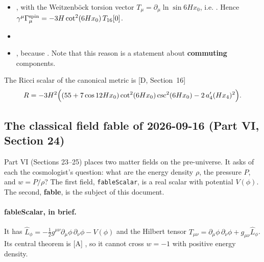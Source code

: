 \begin{itemize}
  \item {},
        with the Weitzenb\"ock torsion vector $T_\mu=\partial_\mu\ln\sin 6Hx_0$, i.e.
        .
        Hence $\gamma^\mu\Gamma^{\rm spin}_\mu=-3H\cot^2(6Hx_0)\,T_{16}[0]$.
  \item {}
  \item {},
        because .
        Note that this reason is a statement about \textbf{commuting} components.
\end{itemize}
The Ricci scalar of the canonical metric is [D, Section~16]
\begin{equation}
  R=-3H^2\Bigl((55+7\cos 12Hx_0)\cot^2(6Hx_0)\csc^2(6Hx_0)-2\,a_4'(Hx_4)^2\Bigr).
\end{equation}

\subsection{The classical field fable of 2026-09-16 (Part VI, Section 24)}
\label{fnd:fable}\label{sec:2.12}

Part VI (Sections 23--25) places two matter fields on the pre-universe. It asks of each the
cosmologist's question: what are the energy density $\rho$, the pressure $P$, and $w=P/\rho$? The
first field, \texttt{fableScalar}, is a real scalar with potential $V(\phi)$. The second,
\textbf{fable}, is the subject of this document.

\paragraph{fableScalar, in brief.} It has
$\hat L_\phi=-\tfrac12 g^{\mu\nu}\partial_\mu\phi\,\partial_\nu\phi-V(\phi)$ and the Hilbert tensor
$T_{\mu\nu}=\partial_\mu\phi\,\partial_\nu\phi+g_{\mu\nu}\hat L_\phi$. Its central theorem is [A]
,
so it cannot cross $w=-1$ with positive energy density.

